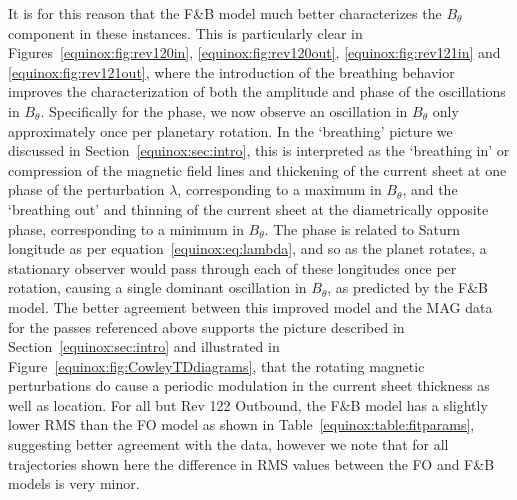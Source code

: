 It is for this reason that the F{\&}B model much better characterizes the $B_{\theta}$ component in these instances. This is particularly clear in Figures~\ref{equinox:fig:rev120in}, \ref{equinox:fig:rev120out}, \ref{equinox:fig:rev121in} and \ref{equinox:fig:rev121out}, where the introduction of the breathing behavior improves the characterization of both the amplitude and phase of the oscillations in $B_{\theta}$. Specifically for the phase, we now observe an oscillation in $B_{\theta}$ only approximately once per planetary rotation. In the `breathing' picture we discussed in Section~\ref{equinox:sec:intro}, this is interpreted as the `breathing in' or compression of the magnetic field lines and thickening of the current sheet at one phase of the perturbation $\lambda$, corresponding to a maximum in $B_{\theta}$, and the `breathing out' and thinning of the current sheet at the diametrically opposite phase, corresponding to a minimum in $B_{\theta}$. The phase is related to Saturn longitude as per equation~\ref{equinox:eq:lambda}, and so as the planet rotates, a stationary observer would pass through each of these longitudes once per rotation, causing a single dominant oscillation in $B_{\theta}$, as predicted by the F{\&}B model. The better agreement between this improved model and the MAG data for the passes referenced above supports the picture described in Section~\ref{equinox:sec:intro} and illustrated in Figure~\ref{equinox:fig:CowleyTDdiagrams}, that the rotating magnetic perturbations do cause a periodic modulation in the current sheet thickness as well as location. For all but Rev 122 Outbound, the F{\&}B model has a slightly lower RMS than the FO model as shown in Table~\ref{equinox:table:fitparams}, suggesting better agreement with the data, however we note that for all trajectories shown here the difference in RMS values between the FO and F\&B models is very minor.

